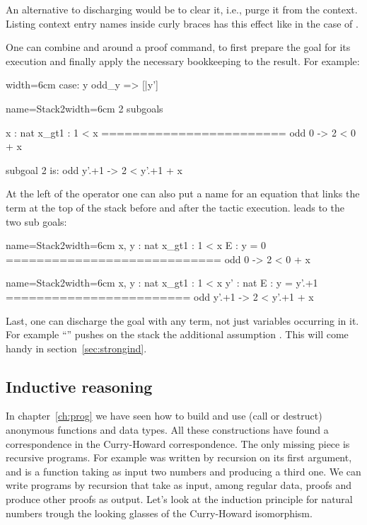 An alternative to discharging  would be to clear it, i.e., purge it
from the context.  Listing context entry names inside curly braces has this
effect like in the case of .

One can combine \C{:} and \C{=>} around a proof command, to first prepare the
goal for its execution and finally apply the necessary bookkeeping to the
result.  For example:

\begin{coq}{}{width=6cm}
case: y odd_y => [|y']
\end{coq}
\begin{coqout}{name=Stack2}{width=6cm}
2 subgoals

  x : nat
  x_gt1 : 1 < x
  ========================
   odd 0 -> 2 < 0 + x

subgoal 2 is:
 odd y'.+1 -> 2 < y'.+1 + x
\end{coqout}

At the left of the \C{:} operator one can also put a name for an
equation that links the term at the top of the stack before and
after the tactic execution.   leads to
the two sub goals:

\begin{coqout}{name=Stack2}{width=6cm}
 x, y : nat
 x_gt1 : 1 < x
 E : y = 0
============================
 odd 0 -> 2 < 0 + x
\end{coqout}
\begin{coqout}{name=Stack2}{width=6cm}
 x, y : nat
 x_gt1 : 1 < x
 y' : nat
 E : y = y'.+1
========================
 odd y'.+1 -> 2 < y'.+1 + x
\end{coqout}

Last, one can discharge the goal with any term, not
just variables occurring in it.  For example
``'' pushes on the stack
the additional assumption .  This
will come handy in section~\ref{sec:strongind}.

\subsection{Inductive reasoning}\label{ssec:indreason}

In chapter~\ref{ch:prog} we have seen how to build and use (call or destruct)
anonymous functions and data types.  All these
constructions have found a correspondence in the Curry-Howard correspondence.
The only missing piece is recursive programs.  For example
 was written by recursion on its first argument, and is a
function taking as input two numbers and producing a third one.
We can write programs by recursion that take as input, among regular  data,
proofs and produce  other proofs as output.  Let's look at the
induction principle for natural numbers trough the looking glasses of the
Curry-Howard isomorphism.


